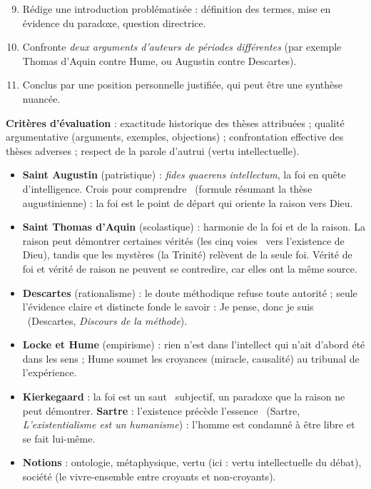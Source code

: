 \documentclass[11pt]{article}
\newcounter{popsec}
\newcounter{popsub}
\newcommand{\courssub}[1]{%
  \stepcounter{popsub}%
  \par\vspace{9pt}\noindent{\popxbold\fontsize{11.5}{13}\selectfont\color{popink}{\color{poporange}\thepopsec.\thepopsub}\hspace{6pt}#1}\par\nopagebreak\vspace{4pt}
}
\begin{document}
\begin{enumerate}
\setcounter{enumi}{8}
\item Rédige une introduction problématisée : définition des termes, mise en évidence du paradoxe, question directrice.
\item Confronte \emph{deux arguments d'auteurs de périodes différentes} (par exemple Thomas d'Aquin contre Hume, ou Augustin contre Descartes).
\item Conclus par une position personnelle justifiée, qui peut être une synthèse nuancée.
\end{enumerate}

\textbf{Critères d'évaluation} : exactitude historique des thèses attribuées ; qualité argumentative (arguments, exemples, objections) ; confrontation effective des thèses adverses ; respect de la parole d'autrui (vertu intellectuelle).

\courssub{Ressources à mobiliser}

\begin{aretenir}
\begin{itemize}
\item \textbf{Saint Augustin} (patristique) : \emph{fides quaerens intellectum}, la foi en quête d'intelligence. \guillemotleft Crois pour comprendre \guillemotright\ (formule résumant la thèse augustinienne) : la foi est le point de départ qui oriente la raison vers Dieu.
\item \textbf{Saint Thomas d'Aquin} (scolastique) : harmonie de la foi et de la raison. La raison peut démontrer certaines vérités (les \guillemotleft cinq voies \guillemotright\ vers l'existence de Dieu), tandis que les mystères (la Trinité) relèvent de la seule foi. Vérité de foi et vérité de raison ne peuvent se contredire, car elles ont la même source.
\item \textbf{Descartes} (rationalisme) : le doute méthodique refuse toute autorité ; seule l'évidence claire et distincte fonde le savoir : \guillemotleft Je pense, donc je suis \guillemotright\ (Descartes, \emph{Discours de la méthode}).
\item \textbf{Locke et Hume} (empirisme) : rien n'est dans l'intellect qui n'ait d'abord été dans les sens ; Hume soumet les croyances (miracle, causalité) au tribunal de l'expérience.
\item \textbf{Kierkegaard} : la foi est un \guillemotleft saut \guillemotright\ subjectif, un paradoxe que la raison ne peut démontrer. \textbf{Sartre} : \guillemotleft l'existence précède l'essence \guillemotright\ (Sartre, \emph{L'existentialisme est un humanisme}) : l'homme est condamné à être libre et se fait lui-même.
\item \textbf{Notions} : ontologie, métaphysique, vertu (ici : vertu intellectuelle du débat), société (le vivre-ensemble entre croyants et non-croyants).
\end{itemize}
\end{aretenir}
\end{document}
